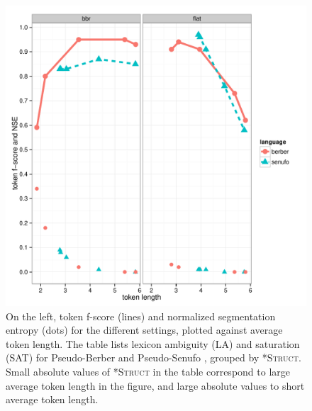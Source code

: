\documentclass[11pt]{article}
\begin{document}
\begin{figure}[t!]
\begin{minipage}[t]{0.50\paperwidth}%
\vspace{-50pt}
	\includegraphics[scale=0.55]{plots/bens_version_2.pdf}
\end{minipage}%
\begin{minipage}[t][1\totalheight][c]{0.3\paperwidth}%
\vspace{0pt}
\end{minipage}
\caption{\label{Results.} On the left, token f-score (lines) and normalized segmentation entropy (dots) for the different settings, plotted against average token length. The table lists lexicon ambiguity (LA) and saturation (SAT) for Pseudo-Berber and Pseudo-Senufo , grouped by \textsc{*Struct}. Small absolute values of \textsc{*Struct} in the table correspond to large average token length in the figure, and large absolute values to short average token length.}
\end{figure}
\end{document}
